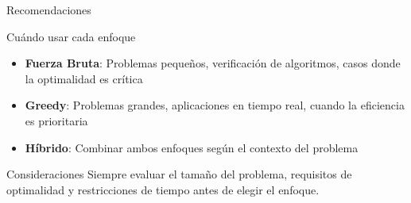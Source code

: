 \documentclass[aspectratio=169]{beamer}
\begin{document}
\begin{frame}{Recomendaciones}
  \begin{block}{Cuándo usar cada enfoque}
    \begin{itemize}
      \item \textbf{Fuerza Bruta}: Problemas pequeños, verificación de algoritmos, casos donde la optimalidad es crítica
      \item \textbf{Greedy}: Problemas grandes, aplicaciones en tiempo real, cuando la eficiencia es prioritaria
      \item \textbf{Híbrido}: Combinar ambos enfoques según el contexto del problema
    \end{itemize}
  \end{block}
  
  \begin{alertblock}{Consideraciones}
    Siempre evaluar el tamaño del problema, requisitos de optimalidad y restricciones de tiempo antes de elegir el enfoque.
  \end{alertblock}
\end{frame}
\end{document}
